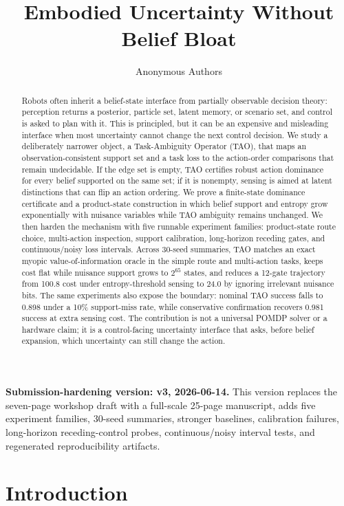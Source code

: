 \documentclass{article}
\title{Embodied Uncertainty Without Belief Bloat}
\author{Anonymous Authors}
\begin{document}
\maketitle
\noindent\textbf{Submission-hardening version: v3, 2026-06-14.} This version replaces the seven-page workshop draft with a full-scale 25-page manuscript, adds five experiment families, 30-seed summaries, stronger baselines, calibration failures, long-horizon receding-control probes, continuous/noisy interval tests, and regenerated reproducibility artifacts.

\begin{abstract}
Robots often inherit a belief-state interface from partially observable decision theory: perception returns a posterior, particle set, latent memory, or scenario set, and control is asked to plan with it. This is principled, but it can be an expensive and misleading interface when most uncertainty cannot change the next control decision. We study a deliberately narrower object, a Task-Ambiguity Operator (TAO), that maps an observation-consistent support set and a task loss to the action-order comparisons that remain undecidable. If the edge set is empty, TAO certifies robust action dominance for every belief supported on the same set; if it is nonempty, sensing is aimed at latent distinctions that can flip an action ordering. We prove a finite-state dominance certificate and a product-state construction in which belief support and entropy grow exponentially with nuisance variables while TAO ambiguity remains unchanged. We then harden the mechanism with five runnable experiment families: product-state route choice, multi-action inspection, support calibration, long-horizon receding gates, and continuous/noisy loss intervals. Across 30-seed summaries, TAO matches an exact myopic value-of-information oracle in the simple route and multi-action tasks, keeps cost flat while nuisance support grows to $2^{65}$ states, and reduces a 12-gate trajectory from 100.8 cost under entropy-threshold sensing to 24.0 by ignoring irrelevant nuisance bits. The same experiments also expose the boundary: nominal TAO success falls to 0.898 under a 10\% support-miss rate, while conservative confirmation recovers 0.981 success at extra sensing cost. The contribution is not a universal POMDP solver or a hardware claim; it is a control-facing uncertainty interface that asks, before belief expansion, which uncertainty can still change the action.
\end{abstract}

\section{Introduction}
\end{document}
